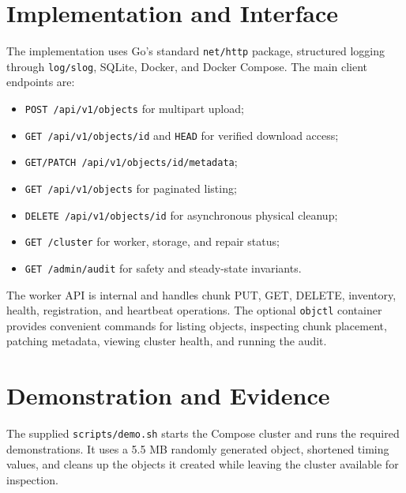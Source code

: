 \documentclass[11pt,a4paper]{article}
\begin{document}
\section{Implementation and Interface}

The implementation uses Go's standard \texttt{net/http} package, structured logging through \texttt{log/slog}, SQLite, Docker, and Docker Compose. The main client endpoints are:
\begin{itemize}
  \item \texttt{POST /api/v1/objects} for multipart upload;
  \item \texttt{GET /api/v1/objects/{id}} and \texttt{HEAD} for verified download access;
  \item \texttt{GET/PATCH /api/v1/objects/{id}/metadata};
  \item \texttt{GET /api/v1/objects} for paginated listing;
  \item \texttt{DELETE /api/v1/objects/{id}} for asynchronous physical cleanup;
  \item \texttt{GET /cluster} for worker, storage, and repair status;
  \item \texttt{GET /admin/audit} for safety and steady-state invariants.
\end{itemize}

The worker API is internal and handles chunk PUT, GET, DELETE, inventory, health, registration, and heartbeat operations. The optional \texttt{objctl} container provides convenient commands for listing objects, inspecting chunk placement, patching metadata, viewing cluster health, and running the audit.

\section{Demonstration and Evidence}

The supplied \texttt{scripts/demo.sh} starts the Compose cluster and runs the required demonstrations. It uses a 5.5 MB randomly generated object, shortened timing values, and cleans up the objects it created while leaving the cluster available for inspection.
\end{document}
